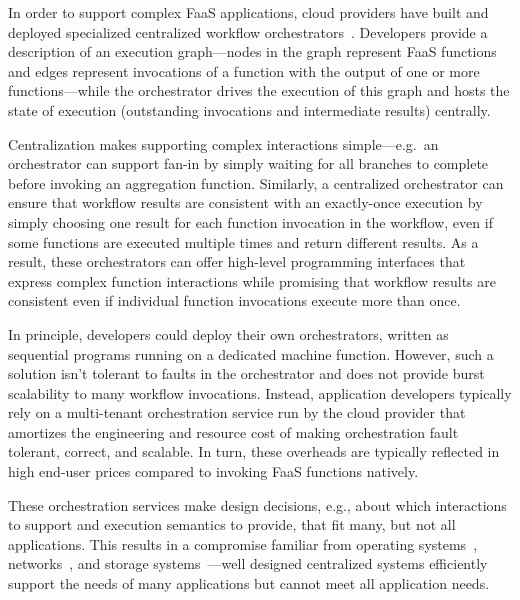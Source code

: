 In order to support complex FaaS applications, cloud providers have built and
deployed specialized centralized workflow
orchestrators~\cite{aws-step-functions, google-cloud-composer, google-workflows,
durable-functions}. Developers provide a description of an execution
graph---nodes in the graph represent FaaS functions and edges represent
invocations of a function with the output of one or more functions---while the
orchestrator drives the execution of this graph and hosts the state of execution
(outstanding invocations and intermediate results) centrally.

Centralization makes supporting complex interactions simple---e.g.\ an
orchestrator can support fan-in by simply waiting for all branches to complete
before invoking an aggregation function. Similarly, a centralized orchestrator
can ensure that workflow results are consistent with an exactly-once execution
by simply choosing one result for each function invocation in the workflow, even
if some functions are executed multiple times and return different results. As a
result, these orchestrators can offer high-level programming interfaces that
express complex function interactions while promising that workflow results are
consistent even if individual function invocations execute more than once.

In principle, developers could deploy their own orchestrators, written as
sequential programs running on a dedicated machine function. However, such a
solution isn't tolerant to faults in the orchestrator and does not provide burst
scalability to many workflow invocations. Instead, application developers
typically rely on a multi-tenant orchestration service run by the cloud provider
that amortizes the engineering and resource cost of making orchestration fault
tolerant, correct, and scalable. In turn, these overheads are typically
reflected in high end-user prices compared to invoking FaaS functions natively.

These orchestration services make design decisions, e.g., about which
interactions to support and execution semantics to provide, that fit many, but
not all applications. This results in a compromise familiar from operating
systems~\cite{exokernel,spin}, networks~\cite{active-networks,sdn}, and storage
systems~\cite{comet,rust-comet}---well designed centralized systems efficiently
support the needs of many applications but cannot meet all application needs.
%

